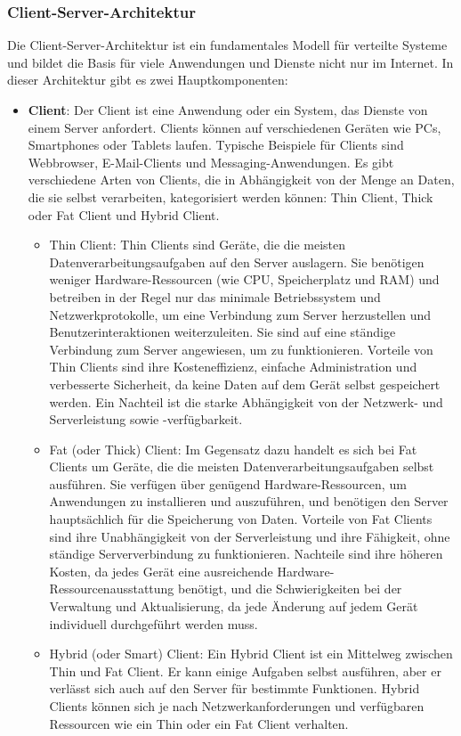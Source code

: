 \subsubsection{Client-Server-Architektur}
Die Client-Server-Architektur ist ein fundamentales Modell für verteilte Systeme und bildet die Basis für viele Anwendungen und Dienste nicht nur im Internet. In dieser Architektur gibt es zwei Hauptkomponenten:

\begin{itemize}
\item \textbf{Client}: Der Client ist eine Anwendung oder ein System, das Dienste von einem Server anfordert. Clients können auf verschiedenen Geräten wie PCs, Smartphones oder Tablets laufen. Typische Beispiele für Clients sind Webbrowser, E-Mail-Clients und Messaging-Anwendungen.
Es gibt verschiedene Arten von Clients, die in Abhängigkeit von der Menge an Daten, die sie selbst verarbeiten, kategorisiert werden können: Thin Client, Thick oder Fat Client und Hybrid Client.
\begin{itemize}
\item Thin Client: Thin Clients sind Geräte, die die meisten Datenverarbeitungsaufgaben auf den Server auslagern. Sie benötigen weniger Hardware-Ressourcen (wie CPU, Speicherplatz und RAM) und betreiben in der Regel nur das minimale Betriebssystem und Netzwerkprotokolle, um eine Verbindung zum Server herzustellen und Benutzerinteraktionen weiterzuleiten. Sie sind auf eine ständige Verbindung zum Server angewiesen, um zu funktionieren.
Vorteile von Thin Clients sind ihre Kosteneffizienz, einfache Administration und verbesserte Sicherheit, da keine Daten auf dem Gerät selbst gespeichert werden. Ein Nachteil ist die starke Abhängigkeit von der Netzwerk- und Serverleistung sowie -verfügbarkeit.
\item Fat (oder Thick) Client: Im Gegensatz dazu handelt es sich bei Fat Clients um Geräte, die die meisten Datenverarbeitungsaufgaben selbst ausführen. Sie verfügen über genügend Hardware-Ressourcen, um Anwendungen zu installieren und auszuführen, und benötigen den Server hauptsächlich für die Speicherung von Daten.
Vorteile von Fat Clients sind ihre Unabhängigkeit von der Serverleistung und ihre Fähigkeit, ohne ständige Serververbindung zu funktionieren. Nachteile sind ihre höheren Kosten, da jedes Gerät eine ausreichende Hardware-Ressourcenausstattung benötigt, und die Schwierigkeiten bei der Verwaltung und Aktualisierung, da jede Änderung auf jedem Gerät individuell durchgeführt werden muss.
\item Hybrid (oder Smart) Client: Ein Hybrid Client ist ein Mittelweg zwischen Thin und Fat Client. Er kann einige Aufgaben selbst ausführen, aber er verlässt sich auch auf den Server für bestimmte Funktionen. Hybrid Clients können sich je nach Netzwerkanforderungen und verfügbaren Ressourcen wie ein Thin oder ein Fat Client verhalten.

\end{itemize}
\end{itemize}
